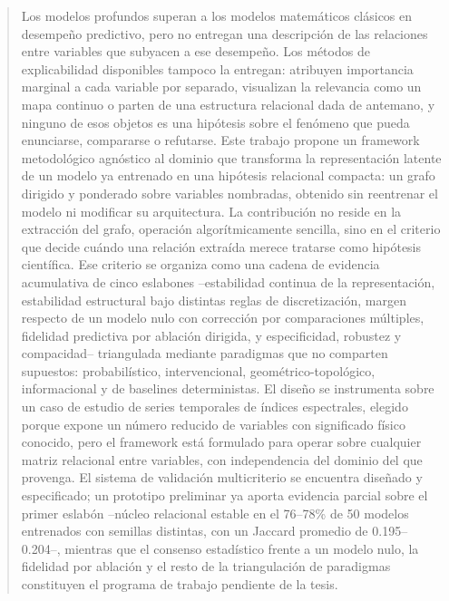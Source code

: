 
\begin{abstract}
Los modelos profundos superan a los modelos matemáticos clásicos en desempeño predictivo, pero no entregan una descripción de las relaciones entre variables que subyacen a ese desempeño. Los métodos de explicabilidad disponibles tampoco la entregan: atribuyen importancia marginal a cada variable por separado, visualizan la relevancia como un mapa continuo o parten de una estructura relacional dada de antemano, y ninguno de esos objetos es una hipótesis sobre el fenómeno que pueda enunciarse, compararse o refutarse. Este trabajo propone un framework metodológico agnóstico al dominio que transforma la representación latente de un modelo ya entrenado en una hipótesis relacional compacta: un grafo dirigido y ponderado sobre variables nombradas, obtenido sin reentrenar el modelo ni modificar su arquitectura. La contribución no reside en la extracción del grafo, operación algorítmicamente sencilla, sino en el criterio que decide cuándo una relación extraída merece tratarse como hipótesis científica. Ese criterio se organiza como una cadena de evidencia acumulativa de cinco eslabones --estabilidad continua de la representación, estabilidad estructural bajo distintas reglas de discretización, margen respecto de un modelo nulo con corrección por comparaciones múltiples, fidelidad predictiva por ablación dirigida, y especificidad, robustez y compacidad-- triangulada mediante paradigmas que no comparten supuestos: probabilístico, intervencional, geométrico-topológico, informacional y de baselines deterministas. El diseño se instrumenta sobre un caso de estudio de series temporales de índices espectrales, elegido porque expone un número reducido de variables con significado físico conocido, pero el framework está formulado para operar sobre cualquier matriz relacional entre variables, con independencia del dominio del que provenga. El sistema de validación multicriterio se encuentra diseñado y especificado; un prototipo preliminar ya aporta evidencia parcial sobre el primer eslabón --núcleo relacional estable en el 76--78\% de 50 modelos entrenados con semillas distintas, con un Jaccard promedio de 0.195--0.204--, mientras que el consenso estadístico frente a un modelo nulo, la fidelidad por ablación y el resto de la triangulación de paradigmas constituyen el programa de trabajo pendiente de la tesis.
\end{abstract}
